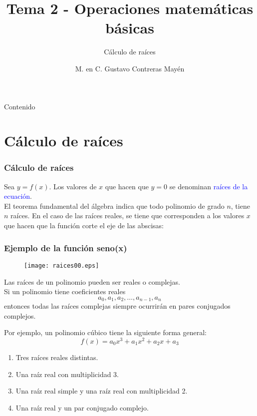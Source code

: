 



\title{Tema 2 - Operaciones matemáticas básicas}
\subtitle{Cálculo de raíces}
\author{M. en C. Gustavo Contreras Mayén}

\maketitle
\fontsize{14}{14}\selectfont
{}
\begin{frame}{Contenido}
\tableofcontents[pausesections]
\end{frame}
\section{Cálculo de raíces}
\begin{frame}
\frametitle{Cálculo de raíces}
Sea $y= f(x)$.  Los valores de $x$ que hacen que $y=0$ se denominan \textcolor{blue}{raíces de la ecuación}.
\\
\bigskip
El teorema fundamental del álgebra indica que todo polinomio de grado $n$, tiene $n$ raíces. En el caso de las raíces reales, se tiene que corresponden a los valores $x$ que hacen que la función corte el eje de las abscisas:
\end{frame}
\begin{frame}
\frametitle{Ejemplo de la función seno(x)}
\begin{figure}
	\centering
	\texttt{[image: raices00.eps]} 
\end{figure}
\end{frame}
\begin{frame}
Las raíces de un polinomio pueden ser reales o complejas.
\\
\bigskip
Si un polinomio tiene coeficientes reales
\[ a_{0},a_{1},a_{2},\ldots,a_{n-1},a_{n} \]
entonces todas las raíces complejas siempre ocurrirán en pares conjugados complejos.
\end{frame}
\begin{frame}
Por ejemplo, un polinomio cúbico tiene la siguiente
forma general:
\[ f(x)= a_{0}x^{3}+a_{1}x^{2}+a_{2}x+a_{3}\]
\begin{enumerate}
\item Tres raíces reales distintas.
\item Una raíz real con multiplicidad 3.
\item Una raíz real simple y una raíz real con multiplicidad 2.
\item Una raíz real y un par conjugado complejo.
\end{enumerate}
\end{frame}
